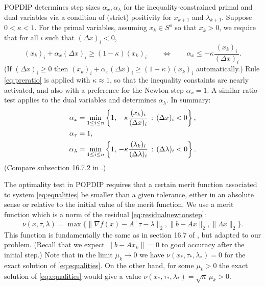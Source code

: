 \documentclass[11pt]{article}
\newcommand{\grad}{\nabla}
\begin{document}
POPDIP determines step sizes $\alpha_x,\alpha_\lambda$ for the inequality-constrained primal and dual variables via a condition of (strict) positivity for $x_{k+1}$ and $\lambda_{k+1}$.  Suppose $0<\kappa<1$.  For the primal variables, assuming $x_k\in S^o$ so that $x_k>0$, we require that for all $i$ such that $(\Delta x)_i < 0$,
\begin{equation}
(x_k)_i + \alpha_x (\Delta x)_i \ge (1-\kappa) (x_k)_i \qquad \iff \qquad \alpha_x \le - \kappa \frac{(x_k)_i}{(\Delta x)_i}. \label{eq:preratio}
\end{equation}
(If $(\Delta x)_i \ge 0$ then $(x_k)_i + \alpha_x (\Delta x)_i \ge (1-\kappa) (x_k)_i$ automatically.)  Rule \eqref{eq:preratio} is applied with $\kappa \approx 1$, so that the inequality constaints are nearly activated, and also with a preference for the Newton step $\alpha_x=1$.  A similar ratio test applies to the dual variables and determines $\alpha_\lambda$.  In summary:
\begin{align}
\alpha_x &= \min_{1\le i\le n} \left\{1, \,-\kappa \frac{(x_k)_i}{(\Delta x)_i} \,:\, (\Delta x)_i < 0\right\}, \label{eq:ratiotests} \\
\alpha_\tau &= 1, \notag \\
\alpha_\lambda &= \min_{1\le i\le n} \left\{1, \,-\kappa \frac{(\lambda_k)_i}{(\Delta \lambda)_i} \,:\, (\Delta \lambda)_i < 0\right\}. \notag
\end{align}
(Compare subsection 16.7.2 in \cite{GrivaNashSofer2009}.)

The optimality test in POPDIP requires that a certain merit function associated to system \eqref{eq:equalities} be smaller than a given tolerance, either in an absolute sense or relative to the initial value of the merit function.  We use a merit function which is a norm of the residual \eqref{eq:residualnewtonstep}:
\begin{equation}
    \nu(x,\tau,\lambda) = \max\{\|\grad f(x)-A^\top \tau - \lambda\|_2,\|b-Ax\|_2,\|\Lambda x\|_2\}.  \label{eq:meritfunction}
\end{equation}
This function is fundamentally the same as in section 16.7 of \cite{GrivaNashSofer2009}, but adapted to our problem.  (Recall that we expect $\|b-Ax_k\|=0$ to good accuracy after the initial step.)  Note that in the limit $\mu_k\to 0$ we have $\nu(x_*,\tau_*,\lambda_*) = 0$ for the exact solution of \eqref{eq:equalities}.  On the other hand, for some $\mu_k > 0$ the exact solution of \eqref{eq:equalities} would give a value $\nu(x_*,\tau_*,\lambda_*)=\sqrt{n}\, \mu_k>0$.
\end{document}
